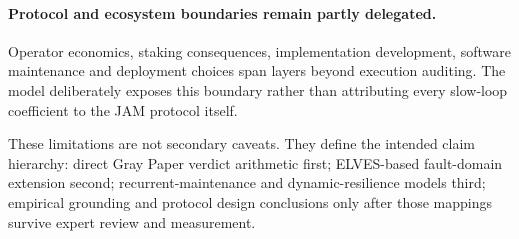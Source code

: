 \paragraph{Protocol and ecosystem boundaries remain partly delegated.}
Operator economics, staking consequences, implementation development, software maintenance and deployment choices span layers beyond execution auditing. The model deliberately exposes this boundary rather than attributing every slow-loop coefficient to the JAM protocol itself.

These limitations are not secondary caveats. They define the intended claim hierarchy: direct Gray Paper verdict arithmetic first; ELVES-based fault-domain extension second; recurrent-maintenance and dynamic-resilience models third; empirical grounding and protocol design conclusions only after those mappings survive expert review and measurement.
